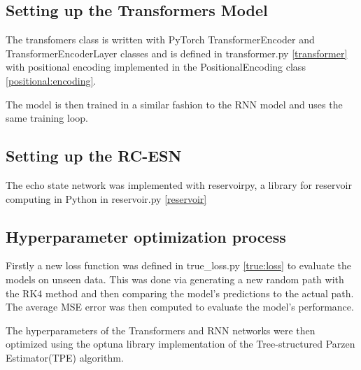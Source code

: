 \documentclass[11pt]{article}
\begin{document}
\subsection{Setting up the Transformers Model}

The transfomers class is written with PyTorch TransformerEncoder and TransformerEncoderLayer classes and is defined in transformer.py \ref{transformer} with positional encoding implemented in the PositionalEncoding class \ref{positional:encoding}.

The model is then trained in a similar fashion to the RNN model and uses the same training loop.

\subsection{Setting up the RC-ESN}

The echo state network was implemented with reservoirpy, a library for reservoir computing in Python in reservoir.py \ref{reservoir}

\subsection{Hyperparameter optimization process}
Firstly a new loss function was defined in true\_loss.py \ref{true:loss} to evaluate the models on unseen data. This was done via generating a new random path with the RK4 method and then comparing the model's predictions to the actual path. The average MSE error was then computed to evaluate the model's performance.


The hyperparameters of the Transformers and RNN networks were then optimized using the optuna library implementation of the Tree-structured Parzen Estimator(TPE) algorithm. 
\end{document}
